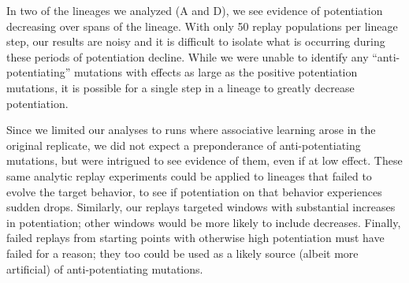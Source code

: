 In two of the lineages we analyzed (A and D), we see evidence of potentiation decreasing over spans of the lineage. 
With only 50 replay populations per lineage step, our results are noisy and it is difficult to isolate what is occurring during these periods of potentiation decline.
While we were unable to identify any ``anti-potentiating'' mutations with effects as large as the positive potentiation mutations, it is possible for a single step in a lineage to greatly decrease potentiation. 

Since we limited our analyses to runs where associative learning arose in the original replicate, we did not expect a preponderance of anti-potentiating mutations, but were intrigued to see evidence of them, even if at low effect.  
These same analytic replay experiments could be applied to lineages that failed to evolve the target behavior, to see if potentiation on that behavior experiences sudden drops. 
Similarly, our replays targeted windows with substantial increases in potentiation; other windows would be more likely to include decreases. 
Finally, failed replays from starting points with otherwise high potentiation must have failed for a reason; they too could be used as a likely source (albeit more artificial) of anti-potentiating mutations.





